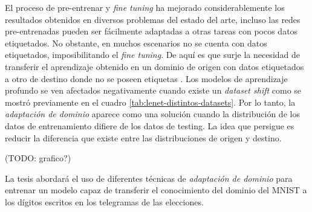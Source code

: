 El proceso de pre-entrenar y {\it fine tuning} ha mejorado considerablemente los resultados obtenidos en diversos
problemas del estado del arte, incluso las redes pre-entrenadas pueden ser f\'acilmente adaptadas a otras tareas con
pocos datos etiquetados. No obstante, en muchos escenarios no se cuenta con datos etiquetados, imposibilitando el {\it
        fine tuning}. De aqu\'i es que surje la necesidad de transferir el aprendizaje obtenido en un dominio de origen con
datos etiquetados a otro de destino donde no se poseen etiquetas \parencite{ben2006analysis}. Los modelos de aprendizaje profundo se ven afectados negativamente cuando existe un {\it
        dataset shift} como se mostr\'o previamente en el cuadro \ref{tab:lenet-distintos-datasets}. Por lo tanto, la {\it
        adaptaci\'on de dominio} aparece como una soluci\'on cuando la distribuci\'on de los datos de entrenamiento difiere de
los datos de testing. La idea que persigue es reducir la diferencia que existe entre las distribuciones de origen y
destino.

(TODO: grafico?)

La tesis abordar\'a el uso de diferentes t\'ecnicas de {\it adaptaci\'on de dominio} para entrenar un modelo capaz de
transferir el conocimiento del dominio del MNIST a los d\'igitos escritos en los telegramas de las elecciones.
